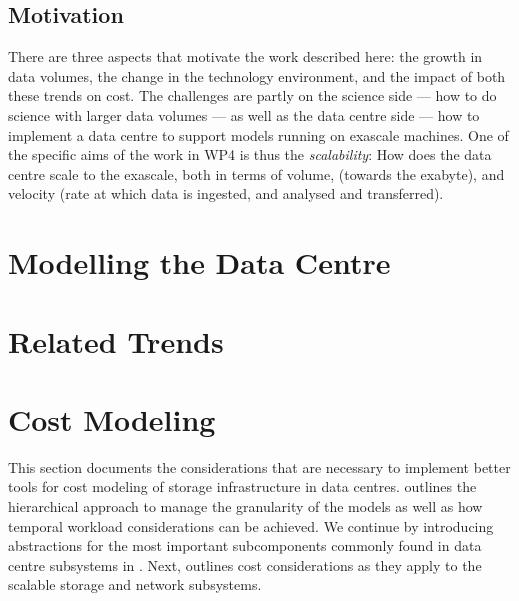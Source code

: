 \documentclass{../../template/esiwace-report}
\begin{document}
\section{Motivation}

There are three aspects that motivate the work described here: the growth in data volumes, the change in the technology environment, and the impact of both these trends on cost.  The challenges are partly on the science side --- how to do science with larger data volumes --- as well as the data
centre side --- how to implement a data centre to support models running on exascale machines.  One of the specific aims of the work in WP4 is thus the \emph{scalability}: How does the data centre scale to the exascale, both in terms of volume, (towards the exabyte), and velocity (rate at which data is ingested, and analysed and transferred).






\chapter{Modelling the Data Centre}



\chapter{Related Trends}


\newpage
 \chapter{Cost Modeling}
\label{sec:modeling}

This section documents the considerations that are necessary to implement better tools for cost modeling of storage infrastructure in data centres.
 outlines the hierarchical approach to manage the granularity of the models as well as how temporal workload considerations can be achieved.
We continue by introducing abstractions for the most important subcomponents commonly found in data centre subsystems in  .
Next,  outlines cost considerations as they apply to the scalable storage and network subsystems.
\end{document}
